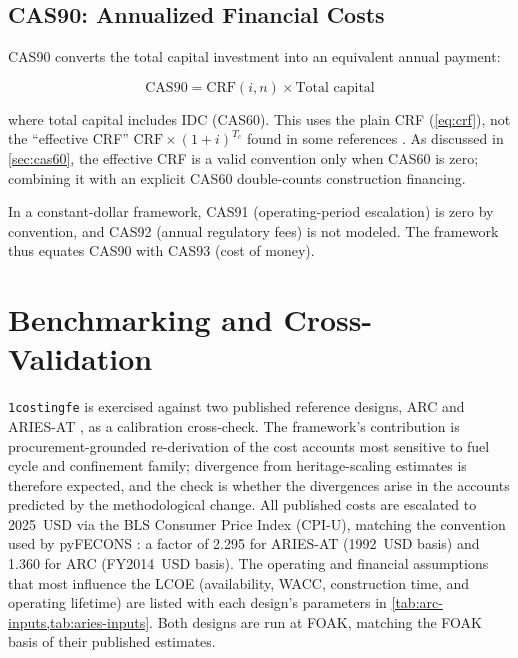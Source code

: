 \documentclass{article}
\begin{document}
\subsection{CAS90: Annualized Financial Costs}
\label{sec:cas90}

CAS90 converts the total capital investment into an equivalent annual
payment:

\begin{equation}
\label{eq:cas90}
\text{CAS90} = \text{CRF}(i, n) \times \text{Total capital}
\end{equation}

\noindent where total capital includes IDC (CAS60). This uses the
plain CRF (\cref{eq:crf}), not the ``effective CRF''
$\text{CRF} \times (1+i)^{T_c}$ found in some references
\citep{miller1998}. As discussed in \cref{sec:cas60}, the effective
CRF is a valid convention only when CAS60 is zero; combining it with
an explicit CAS60 double-counts construction financing.

In a constant-dollar framework, CAS91 (operating-period escalation)
is zero by convention, and CAS92 (annual regulatory fees) is not
modeled. The framework thus equates CAS90 with CAS93 (cost of money).


\section{Benchmarking and Cross-Validation}
\label{sec:benchmark}

\texttt{1costingfe} is exercised against two published
reference designs, ARC \citep{sorbom2015arc} and ARIES-AT
\citep{najmabadi2006ariesat}, as a calibration cross-check. The
framework's contribution is procurement-grounded re-derivation
of the cost accounts most sensitive to fuel cycle and confinement
family; divergence from heritage-scaling estimates is therefore
expected, and the check is whether the divergences arise in the
accounts predicted by the methodological change.
All published costs are escalated to 2025~USD via the BLS Consumer
Price Index (CPI-U), matching the convention used by pyFECONS
\citep{woodruff2026}: a factor of 2.295 for ARIES-AT (1992~USD basis)
and 1.360 for ARC (FY2014~USD basis).
The operating and financial assumptions that most influence the LCOE
(availability, WACC, construction time, and operating lifetime) are listed
with each design's parameters in \cref{tab:arc-inputs,tab:aries-inputs}.
Both designs are run at FOAK, matching the FOAK basis of their published
estimates.
\end{document}
